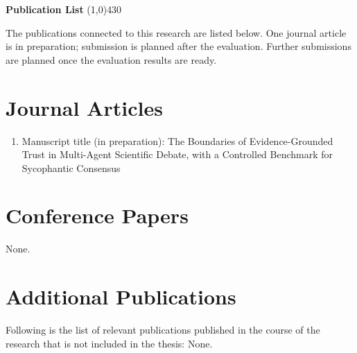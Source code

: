 \clearpage
\setlength{\headheight}{14pt}
\begin{center}
    {\huge \bf Publication List}
    \line(1,0){430}
\end{center}

The publications connected to this research are listed below. One journal article is in preparation; submission is planned after the evaluation. Further submissions are planned once the evaluation results are ready.

\section*{Journal Articles}
\begin{enumerate}
    \item Manuscript title (in preparation): The Boundaries of Evidence-Grounded Trust in Multi-Agent Scientific Debate, with a Controlled Benchmark for Sycophantic Consensus
\end{enumerate}

\section*{Conference Papers}
None.

\section*{Additional Publications}
Following is the list of relevant publications published in the course of the research that is not included in the thesis:
None.



\clearpage
\setlength{\headheight}{12pt}